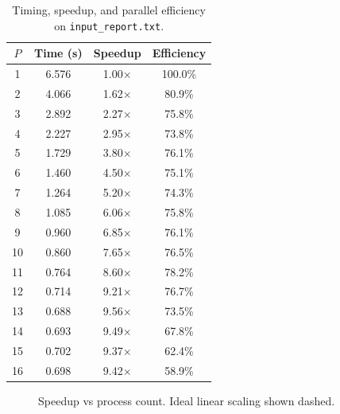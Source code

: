 \documentclass[11pt]{article}
\begin{document}
\begin{table}[H]
\centering
\begin{tabular}{@{}cccc@{}}
\toprule
$P$ & Time (s) & Speedup & Efficiency \\
\midrule
1  & 6.576 & 1.00$\times$ & 100.0\% \\
2  & 4.066 & 1.62$\times$ & 80.9\% \\
3  & 2.892 & 2.27$\times$ & 75.8\% \\
4  & 2.227 & 2.95$\times$ & 73.8\% \\
5  & 1.729 & 3.80$\times$ & 76.1\% \\
6  & 1.460 & 4.50$\times$ & 75.1\% \\
7  & 1.264 & 5.20$\times$ & 74.3\% \\
8  & 1.085 & 6.06$\times$ & 75.8\% \\
9  & 0.960 & 6.85$\times$ & 76.1\% \\
10 & 0.860 & 7.65$\times$ & 76.5\% \\
11 & 0.764 & 8.60$\times$ & 78.2\% \\
12 & 0.714 & 9.21$\times$ & 76.7\% \\
13 & 0.688 & 9.56$\times$ & 73.5\% \\
14 & 0.693 & 9.49$\times$ & 67.8\% \\
15 & 0.702 & 9.37$\times$ & 62.4\% \\
16 & 0.698 & 9.42$\times$ & 58.9\% \\
\bottomrule
\end{tabular}
\caption{Timing, speedup, and parallel efficiency on \texttt{input\_report.txt}.}
\end{table}

\begin{figure}[H]
\centering
{}
\caption{Speedup vs process count. Ideal linear scaling shown dashed.}
\end{figure}
\end{document}
